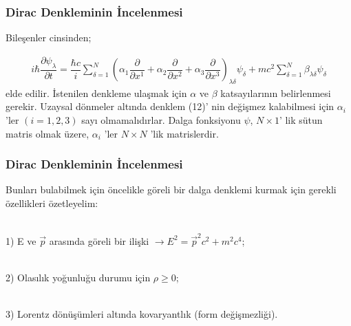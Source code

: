 \documentclass[aspectratio=169,10pt]{beamer}
\begin{document}
	\begin{frame}[allowframebreaks]
\frametitle{Dirac Denkleminin İncelenmesi}

Bileşenler cinsinden;

\begin{align}
    i \hbar \dfrac{\partial \psi_{\lambda}}{\partial t} = \dfrac{\hbar c }{i} \sum_{\delta = 1}^{N} ( \alpha_{1} \dfrac{\partial}{\partial x^{1}} + \alpha_{2} \dfrac{\partial}{\partial x^{2}}+ \alpha_{3} \dfrac{\partial}{\partial x^{3}}  )_{\lambda \delta} \psi_{\delta} + mc^{2} \sum_{\delta = 1}^{N} \beta_{\lambda \delta} \psi_{\delta}
\end{align}
elde edilir. İstenilen denkleme ulaşmak için $\alpha$ ve $\beta$ katsayılarının belirlenmesi gerekir. Uzaysal dönmeler altında denklem (12)’ nin değişmez kalabilmesi için $\alpha_{i}$'ler $(i=1,2,3)$ sayı olmamalıdırlar. Dalga fonksiyonu $\psi$, $N \times 1 $' lik sütun matris olmak üzere, $\alpha_{i}$ 'ler $N \times N$ 'lik matrislerdir.



\end{frame}


	\begin{frame}[allowframebreaks]
\frametitle{Dirac Denkleminin İncelenmesi}

Bunları bulabilmek için öncelikle göreli bir dalga denklemi kurmak için gerekli özellikleri özetleyelim: \\

\

1) E ve $\Vec{p}$ arasında göreli bir ilişki $\rightarrow   E^{2} = \Vec{p}^{2}c^{2} + m^{2} c^{4} $; \\

\

2) Olasılık yoğunluğu durumu için $\rho \geq 0$; \\

\ 

3) Lorentz dönüşümleri altında kovaryantlık (form değişmezliği).



\end{frame}
\end{document}
